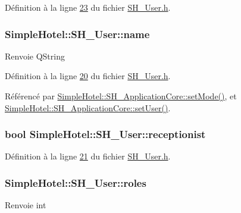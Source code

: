 Définition à la ligne \hyperlink{SH__User_8h_source_l00023}{23} du fichier \hyperlink{SH__User_8h_source}{S\-H\-\_\-\-User.\-h}.

\hypertarget{classSimpleHotel_1_1SH__User_a060aa57674e4cabf6a650b015563da77}{
\subsubsection[{name}]{\setlength{\rightskip}{0pt plus 5cm}Simple\-Hotel\-::\-S\-H\-\_\-\-User\-::name\hspace{0.3cm}{\ttfamily [read]}}}\label{classSimpleHotel_1_1SH__User_a060aa57674e4cabf6a650b015563da77}
\begin{DoxyReturn}{Renvoie}
Q\-String 
\end{DoxyReturn}


Définition à la ligne \hyperlink{SH__User_8h_source_l00020}{20} du fichier \hyperlink{SH__User_8h_source}{S\-H\-\_\-\-User.\-h}.



Référencé par \hyperlink{classSimpleHotel_1_1SH__ApplicationCore_a1661e9a56883ec760064066386b47bab}{Simple\-Hotel\-::\-S\-H\-\_\-\-Application\-Core\-::set\-Mode()}, et \hyperlink{classSimpleHotel_1_1SH__ApplicationCore_a2af3f48e113eaa6771a0fa328bd9f2e1}{Simple\-Hotel\-::\-S\-H\-\_\-\-Application\-Core\-::set\-User()}.

\hypertarget{classSimpleHotel_1_1SH__User_a44c4e3922422c460cabfc7b7011d9bcb}{
\subsubsection[{receptionist}]{\setlength{\rightskip}{0pt plus 5cm}bool Simple\-Hotel\-::\-S\-H\-\_\-\-User\-::receptionist\hspace{0.3cm}{\ttfamily [read]}}}\label{classSimpleHotel_1_1SH__User_a44c4e3922422c460cabfc7b7011d9bcb}


Définition à la ligne \hyperlink{SH__User_8h_source_l00021}{21} du fichier \hyperlink{SH__User_8h_source}{S\-H\-\_\-\-User.\-h}.

\hypertarget{classSimpleHotel_1_1SH__User_ad13699562fa07547a504d1310a9a942b}{
\subsubsection[{roles}]{\setlength{\rightskip}{0pt plus 5cm}Simple\-Hotel\-::\-S\-H\-\_\-\-User\-::roles\hspace{0.3cm}{\ttfamily [read]}}}\label{classSimpleHotel_1_1SH__User_ad13699562fa07547a504d1310a9a942b}
\begin{DoxyReturn}{Renvoie}
int 
\end{DoxyReturn}



